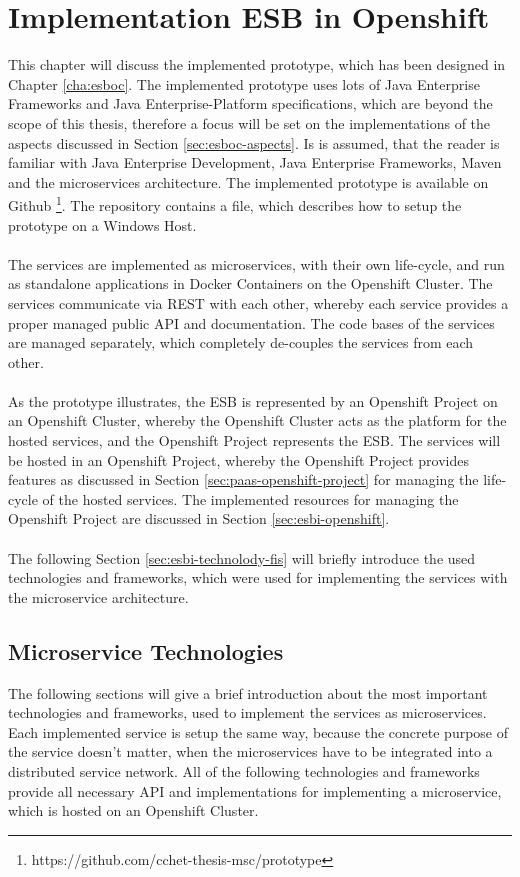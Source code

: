 \chapter{Implementation ESB in Openshift}
\label{cha:esbi}
This chapter will discuss the implemented prototype, which has been designed in Chapter \vref{cha:esboc}. The implemented prototype uses lots of Java Enterprise Frameworks and Java Enterprise-Platform specifications, which are beyond the scope of this thesis, therefore a focus will be set on the implementations of the aspects discussed in Section \vref{sec:esboc-aspects}. Is is assumed, that the reader is familiar with Java Enterprise Development, Java Enterprise Frameworks, Maven and the microservices architecture. The implemented prototype is available on Github \footnote{https://github.com/cchet-thesis-msc/prototype}. The repository contains a  file, which describes how to setup the prototype on a Windows Host. 
\\ \\
The services are implemented as microservices, with their own life-cycle, and run as standalone applications in Docker Containers on the Openshift Cluster. The services communicate via REST with each other, whereby each service provides a proper managed public API and documentation. The code bases of the services are managed separately, which completely de-couples the services from each other.  
\\ \\
As the prototype illustrates, the ESB is represented by an Openshift Project on an Openshift Cluster, whereby the Openshift Cluster acts as the platform for the hosted services, and the Openshift Project represents the ESB. The services will be hosted in an Openshift Project, whereby the Openshift Project provides features as discussed in Section \vref{sec:paas-openshift-project} for managing the life-cycle of the hosted services. The implemented resources for managing the Openshift Project are discussed in Section \vref{sec:esbi-openshift}.
\\ \\
The following Section \vref{sec:esbi-technolody-fis} will briefly introduce the used technologies and frameworks, which were used for implementing the services with the microservice architecture.

\section{Microservice Technologies}
\label{sec:esbi-technolody-fis}
The following sections will give a brief introduction about the most important technologies and frameworks, used to implement the services as microservices. Each implemented service is setup the same way, because the concrete purpose of the service doesn't matter, when the microservices have to be integrated into a distributed service network. All of the following technologies and frameworks provide all necessary API and implementations for implementing a microservice, which is hosted on an Openshift Cluster.


